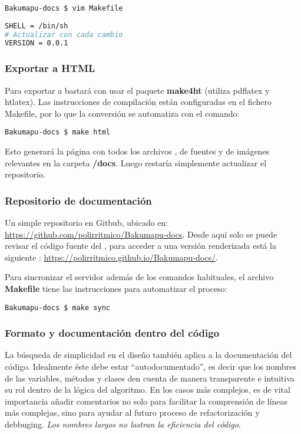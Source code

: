 \begin{lstlisting}
Bakumapu-docs $ vim Makefile
\end{lstlisting}
\begin{lstlisting}[language=bash]
SHELL = /bin/sh
# Actualizar con cada cambio
VERSION = 0.0.1
\end{lstlisting}

\subsubsection{Exportar a HTML}\label{flujo:exportar-a-html}
Para exportar a  bastará con usar el paquete \textbf{make4ht} (utiliza pdflatex y htlatex). Las instrucciones de compilación están configuradas en el fichero Makefile, por lo que la conversión se automatiza con el comando:
\begin{lstlisting}
Bakumapu-docs $ make html
\end{lstlisting}
Esto generará la página  con todos los archivos , de fuentes y de imágenes relevantes en la carpeta \textbf{/docs}. Luego restaría simplemente actualizar el repositorio.

\subsubsection{Repositorio de documentación}\label{flujo:repositorio-de-documentacion}
Un simple repositorio  en Gitbub, ubicado en: \url{https://github.com/polirritmico/Bakumapu-docs}. Desde aquí solo se puede revisar el código fuente del , para acceder a una versión renderizada está la siguiente : \url{https://polirritmico.github.io/Bakumapu-docs/}.

Para sincronizar el servidor además de los comandos  habituales, el archivo \textbf{Makefile} tiene las instrucciones para automatizar el proceso:
\begin{lstlisting}
Bakumapu-docs $ make sync
\end{lstlisting}

\subsubsection{Formato y documentación dentro del código}\label{flujo:documentacion-en-codigo}
La búsqueda de simplicidad en el diseño también aplica a la documentación del código. Idealmente éste debe estar “autodocumentado”, es decir que los nombres de las variables, métodos y clases den cuenta de manera transparente e intuitiva su rol dentro de la lógica del algoritmo. En los casos más complejos, es de vital importancia añadir comentarios no solo para facilitar la comprensión de líneas más complejas, sino para ayudar al futuro proceso de refactorización y debbuging. \emph{Los nombres largos no lastran la eficiencia del código}.

